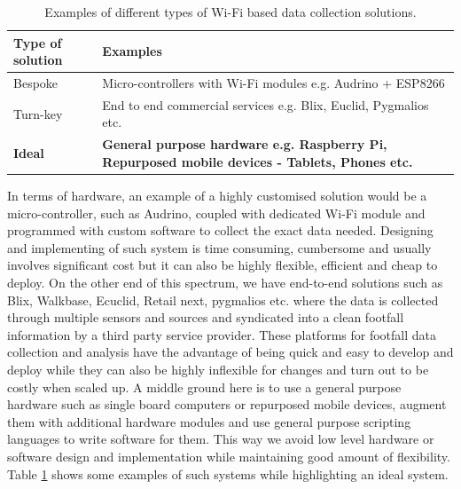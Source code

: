 \begin{table}[h]
  \footnotesize
  \begin{center}
    \begin{tabular}{lp{5cm}}
      \toprule
      Type of solution & Examples\\
      \midrule
      Bespoke & Micro-controllers with Wi-Fi modules e.g. Audrino + ESP8266\\
      Turn-key & End to end commercial services e.g. Blix, Euclid, Pygmalios etc.\\ 
      \textbf{Ideal} & \textbf{General purpose hardware e.g. Raspberry Pi, Repurposed mobile devices - Tablets, Phones etc.}\\
      \bottomrule
    \end{tabular}
  \end{center}
  \caption{Examples of different types of Wi-Fi based data collection solutions.}
  \label{table:toolkit:collection}
\end{table}

In terms of hardware, an example of a highly customised solution would be a micro-controller, such as Audrino, coupled with dedicated Wi-Fi module and programmed with custom software to collect the exact data needed.
Designing and implementing of such system is time consuming, cumbersome and usually involves significant cost but it can also be highly flexible, efficient and cheap to deploy.
On the other end of this spectrum, we have end-to-end solutions such as Blix, Walkbase, Ecuclid, Retail next, pygmalios etc. where the data is collected through multiple sensors and sources and syndicated into a clean footfall information by a third party service provider.
These platforms for footfall data collection and analysis have the advantage of being quick and easy to develop and deploy while they can also be highly inflexible for changes and turn out to be costly when scaled up.
A middle ground here is to use a general purpose hardware such as single board computers or repurposed mobile devices, augment them with additional hardware modules and use general purpose scripting languages to write software for them.
This way we avoid low level hardware or software design and implementation while maintaining good amount of flexibility.
Table \ref{table:toolkit:collection} shows some examples of such systems while highlighting an ideal system.

